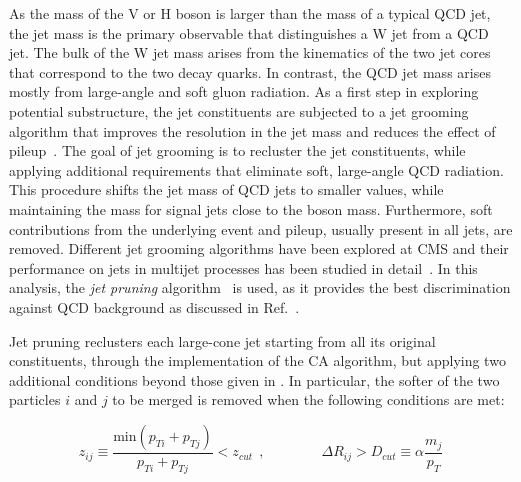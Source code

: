As the mass of the V or H boson is larger than the mass of a typical QCD jet, the jet mass is the primary observable that distinguishes a W jet from a QCD jet. The bulk of the W jet mass arises from the kinematics of the two jet cores that correspond to the two decay quarks. In contrast, the QCD jet mass arises mostly from large-angle and soft gluon radiation.
As a first step in exploring potential substructure, the jet constituents are subjected to a jet grooming algorithm that improves the resolution in the jet mass and reduces the effect of pileup~\cite{Chatrchyan:2013vbb,Khachatryan:2014vla}. The goal of jet grooming is to recluster the jet constituents, while applying additional requirements that eliminate soft, large-angle QCD radiation. This procedure shifts the jet mass of QCD jets to smaller values, while maintaining the mass for signal jets close to the boson mass. Furthermore, soft contributions from the underlying event and pileup, usually present in all jets, are removed.
Different jet grooming algorithms have been explored at CMS and their performance on jets in multijet processes has been studied in detail~\cite{Chatrchyan:2013vbb,Khachatryan:2014vla}. In this analysis, the \emph{jet pruning} algorithm~\cite{jetpruning1,Ellis:2009me} is used, as it provides the best discrimination against QCD background as discussed in Ref.~\cite{Chatrchyan:2013vbb,Khachatryan:2014vla}.

Jet pruning reclusters each large-cone jet starting from all its original constituents, through the implementation of the CA algorithm, but applying two additional conditions beyond those given in . In particular, the softer of the two particles $i$ and $j$ to be merged is removed when the following conditions are met:

\begin{equation}
z_{ij} \equiv \frac{\mathrm{min}(p_{Ti} + p_{Tj})}{p_{Ti} + p_{Tj}} < z_{cut}\:\:,
\quad\quad\quad\quad
\Delta R_{ij} > D_{cut} \equiv \alpha\frac{m_j}{p_T}
\end{equation}

